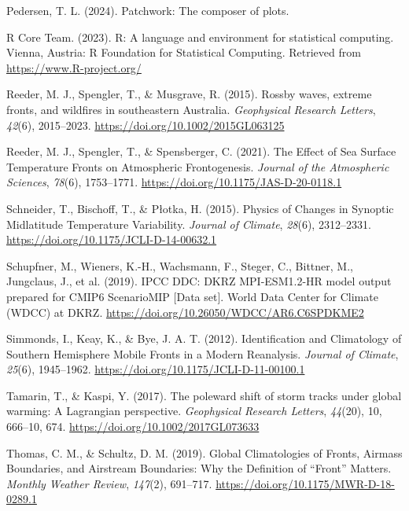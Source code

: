 \documentclass[
]{agujournal2019}
\newlength{\cslhangindent}
\newenvironment{CSLReferences}[2] %
 {\begin{list}{}{%
  \setlength{\itemindent}{0pt}
  \setlength{\leftmargin}{0pt}
  \setlength{\parsep}{0pt}
  \ifodd #1
   \setlength{\leftmargin}{\cslhangindent}
   \setlength{\itemindent}{-1\cslhangindent}
  \fi
  \setlength{\itemsep}{#2\baselineskip}}}
 {\end{list}}
\begin{document}
\begin{CSLReferences}{1}{0}
Pedersen, T. L. (2024). Patchwork: The composer of plots.

R Core Team. (2023). R: A language and environment for statistical
computing. Vienna, Austria: R Foundation for Statistical Computing.
Retrieved from \url{https://www.R-project.org/}

Reeder, M. J., Spengler, T., \& Musgrave, R. (2015). Rossby waves,
extreme fronts, and wildfires in southeastern {Australia}.
\emph{Geophysical Research Letters}, \emph{42}(6), 2015--2023.
\url{https://doi.org/10.1002/2015GL063125}

Reeder, M. J., Spengler, T., \& Spensberger, C. (2021). The {Effect} of
{Sea Surface Temperature Fronts} on {Atmospheric Frontogenesis}.
\emph{Journal of the Atmospheric Sciences}, \emph{78}(6), 1753--1771.
\url{https://doi.org/10.1175/JAS-D-20-0118.1}

Schneider, T., Bischoff, T., \& Płotka, H. (2015). Physics of {Changes}
in {Synoptic Midlatitude Temperature Variability}. \emph{Journal of
Climate}, \emph{28}(6), 2312--2331.
\url{https://doi.org/10.1175/JCLI-D-14-00632.1}

Schupfner, M., Wieners, K.-H., Wachsmann, F., Steger, C., Bittner, M.,
Jungclaus, J., et al. (2019). {IPCC DDC}: {DKRZ MPI-ESM1}.2-{HR} model
output prepared for {CMIP6 ScenarioMIP} {[}Data set{]}. World Data
Center for Climate (WDCC) at DKRZ.
\url{https://doi.org/10.26050/WDCC/AR6.C6SPDKME2}

Simmonds, I., Keay, K., \& Bye, J. A. T. (2012). Identification and
{Climatology} of {Southern Hemisphere Mobile Fronts} in a {Modern
Reanalysis}. \emph{Journal of Climate}, \emph{25}(6), 1945--1962.
\url{https://doi.org/10.1175/JCLI-D-11-00100.1}

Tamarin, T., \& Kaspi, Y. (2017). The poleward shift of storm tracks
under global warming: {A Lagrangian} perspective. \emph{Geophysical
Research Letters}, \emph{44}(20), 10, 666--10, 674.
\url{https://doi.org/10.1002/2017GL073633}

Thomas, C. M., \& Schultz, D. M. (2019). Global {Climatologies} of
{Fronts}, {Airmass Boundaries}, and {Airstream Boundaries}: {Why} the
{Definition} of {``{Front}''} {Matters}. \emph{Monthly Weather Review},
\emph{147}(2), 691--717. \url{https://doi.org/10.1175/MWR-D-18-0289.1}


\end{CSLReferences}
\end{document}
